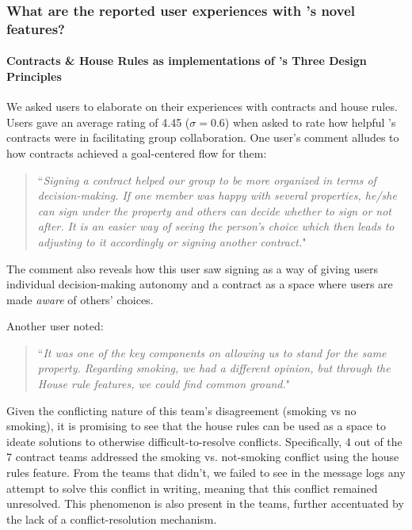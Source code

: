 \subsubsection{What are the reported user experiences with \tool's novel features?}
\label{sssection:novel-features}

\paragraph{Contracts \& House Rules as implementations of \tool's Three Design Principles}
We asked \tool users to elaborate on their experiences with contracts and house rules. Users gave an average rating of 4.45 ($\sigma = 0.6$) when asked to rate how helpful \tool's contracts were in facilitating group collaboration.
One user's comment alludes to how contracts achieved a goal-centered flow for them: 
\begin{quote}
``\textit{Signing a contract helped our group to be more organized in terms of decision-making. If one member was happy with several properties, he/she can sign under the property and others can decide whether to sign or not after. It is an easier way of seeing the person’s choice which then leads to adjusting to it accordingly or signing another contract.}"
\end{quote}
The comment also reveals how this user saw signing as a way of giving users individual decision-making autonomy and a contract as a space where users are made \textit{aware} of others' choices.

Another user noted:
\begin{quote}
``\textit{It was one of the key components on allowing us to stand for the same property. Regarding
smoking, we had a different opinion, but through the House rule features, we could find common ground.}"
\end{quote}
Given the conflicting nature of this team’s disagreement (smoking vs no smoking), it is promising to see that
the house rules can be used as a space to ideate solutions to otherwise difficult-to-resolve conflicts. Specifically, 4 out of the 7 contract teams addressed the smoking vs. not-smoking conflict using the house rules feature. From the teams that didn't, we failed to see in the message logs any attempt to solve this conflict in writing, meaning that this conflict remained unresolved. This phenomenon is also present in the \baseline teams, further accentuated by the lack of a conflict-resolution mechanism.

